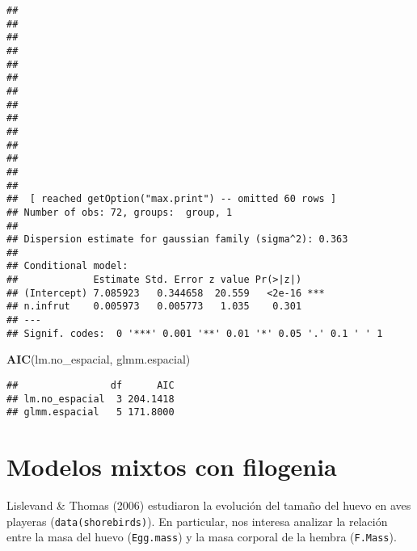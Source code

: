 \documentclass[
]{book}
\newenvironment{Shaded}{\begin{snugshade}}{\end{snugshade}}
\newcommand{\KeywordTok}[1]{\textcolor[rgb]{0.13,0.29,0.53}{\textbf{#1}}}
\newcommand{\NormalTok}[1]{#1}
\begin{document}
\begin{verbatim}
##                                                                        
##                                                                        
##                                                                        
##                                                                        
##                                                                        
##                                                                        
##                                                                        
##                                                                        
##                                                                        
##                                                                        
##                                                                        
##                                                                        
##                                                                        
##                                                                        
##  [ reached getOption("max.print") -- omitted 60 rows ]
## Number of obs: 72, groups:  group, 1
## 
## Dispersion estimate for gaussian family (sigma^2): 0.363 
## 
## Conditional model:
##             Estimate Std. Error z value Pr(>|z|)    
## (Intercept) 7.085923   0.344658  20.559   <2e-16 ***
## n.infrut    0.005973   0.005773   1.035    0.301    
## ---
## Signif. codes:  0 '***' 0.001 '**' 0.01 '*' 0.05 '.' 0.1 ' ' 1
\end{verbatim}

\begin{Shaded}
\begin{Highlighting}[]
\KeywordTok{AIC}\NormalTok{(lm.no_espacial, glmm.espacial)}
\end{Highlighting}
\end{Shaded}

\begin{verbatim}
##                df      AIC
## lm.no_espacial  3 204.1418
## glmm.espacial   5 171.8000
\end{verbatim}

\hypertarget{modelos-mixtos-con-filogenia}{%
\section{Modelos mixtos con filogenia}\label{modelos-mixtos-con-filogenia}}

Lislevand \& Thomas (2006) estudiaron la evolución del tamaño del huevo en aves playeras (\texttt{data(shorebirds)}). En particular, nos interesa analizar la relación entre la masa del huevo (\texttt{Egg.mass}) y la masa corporal de la hembra (\texttt{F.Mass}).
\end{document}
